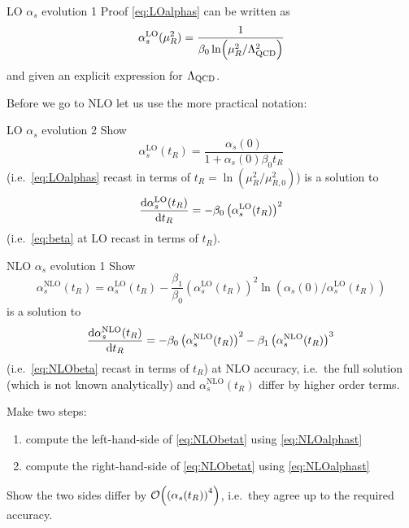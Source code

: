\begin{exercisebox}[label={box:LOalphas}]{LO $\alpha_s$ evolution 1}
    Proof \cref{eq:LOalphas} can be written as
    \begin{equation}
        \alpha_s^\text{LO}(\mu_R^2) = \frac 1 {\beta_0 \ln(\mu_R^2/\Lambda_\text{QCD}^2)}
    \end{equation}
    and given an explicit expression for $\Lambda_\text{QCD}$.
\end{exercisebox}

Before we go to NLO let us use the more practical notation:
\begin{exercisebox}[label={box:LOalphassol}]{LO $\alpha_s$ evolution 2}
    Show
    \begin{equation}
        \alpha_s^\text{LO}(t_R) = \frac{\alpha_s(0)}{1 + \alpha_s(0) \beta_0 t_R} \label{eq:LOalphast}
    \end{equation}
    (i.e.\ \cref{eq:LOalphas} recast in terms of $t_R = \ln(\mu_R^2/\mu_{R,0}^2)$) is a solution to
    \begin{equation}
        \dv {\alpha_s^\text{LO}(t_R)}{t_R} = -\beta_0 \left(\alpha_s^\text{LO}(t_R)\right)^2
    \end{equation}
    (i.e.\ \cref{eq:beta} at LO recast in terms of $t_R$).
\end{exercisebox}

\begin{exercisebox}[label={box:NLOalphas}]{NLO $\alpha_s$ evolution 1}
    Show
    \begin{equation}
        \alpha_s^\text{NLO}(t_R) = \alpha_s^\text{LO}(t_R) - \frac{\beta_1}{\beta_0} \left(\alpha_s^\text{LO}(t_R)\right)^2 \ln(\alpha_s(0) / \alpha_s^\text{LO}(t_R)) \label{eq:NLOalphast}
    \end{equation}
    is a solution to
    \begin{equation}
        \dv {\alpha_s^\text{NLO}(t_R)}{t_R} = -\beta_0 \left(\alpha_s^\text{NLO}(t_R)\right)^2 -\beta_1 \left(\alpha_s^\text{NLO}(t_R)\right)^3 \label{eq:NLObetat}\,
    \end{equation}
    (i.e.\ \cref{eq:NLObeta} recast in terms of $t_R$) at NLO accuracy, i.e.\ the full solution (which is not known analytically) and $\alpha_s^\text{NLO}(t_R)$ differ by higher order terms.
\end{exercisebox}
\noindent{}Make two steps:
\begin{enumerate}
    \item compute the left-hand-side of \cref{eq:NLObetat} using \cref{eq:NLOalphast}
    \item compute the right-hand-side of \cref{eq:NLObetat} using \cref{eq:NLOalphast}
\end{enumerate}
Show the two sides differ by $\order{\qty(\alpha_s(t_R))^4}$, i.e.\ they agree up to the required accuracy.


